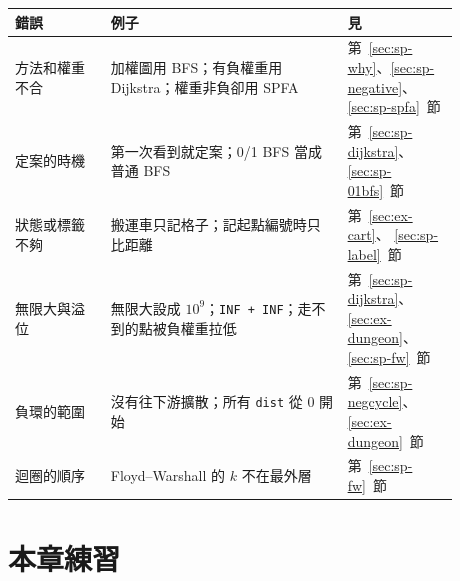 \begin{center}
\begin{tabular}{p{0.19\linewidth}p{0.47\linewidth}>{\raggedright\arraybackslash}p{0.22\linewidth}}
\toprule
錯誤 & 例子 & 見 \\
\midrule
方法和權重不合 & 加權圖用 BFS；有負權重用 Dijkstra；權重非負卻用 SPFA &
第~\ref{sec:sp-why}、\ref{sec:sp-negative}、\ref{sec:sp-spfa}~節 \\
定案的時機 & 第一次看到就定案；0/1 BFS 當成普通 BFS & 第~\ref{sec:sp-dijkstra}、
\ref{sec:sp-01bfs}~節 \\
狀態或標籤不夠 & 搬運車只記格子；記起點編號時只比距離 & 第~\ref{sec:ex-cart}、
\ref{sec:sp-label}~節 \\
無限大與溢位 & 無限大設成 $10^9$；\texttt{INF + INF}；走不到的點被負權重拉低 &
第~\ref{sec:sp-dijkstra}、\ref{sec:ex-dungeon}、\ref{sec:sp-fw}~節 \\
負環的範圍 & 沒有往下游擴散；所有 \texttt{dist} 從 $0$ 開始 &
第~\ref{sec:sp-negcycle}、\ref{sec:ex-dungeon}~節 \\
迴圈的順序 & Floyd--Warshall 的 $k$ 不在最外層 & 第~\ref{sec:sp-fw}~節 \\
\bottomrule
\end{tabular}
\end{center}

\section{本章練習}
\label{sec:ch8-exercises}

